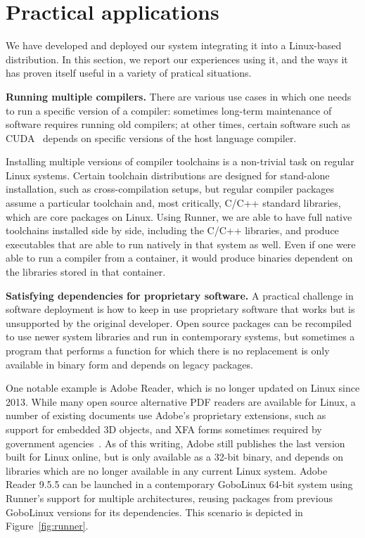 \documentclass[sigplan, anonymous, 10pt]{acmart}
\begin{document}
\section{Practical applications}\label{sec:applications}
We have developed and deployed our system integrating it into a Linux-based
distribution. In this section, we report our experiences using it, and the ways it has
proven itself useful in a variety of pratical situations.

\textbf{Running multiple compilers.}
There are various use cases in which one needs to run a specific version of
a compiler: sometimes long-term maintenance of software requires running
old compilers; at other times, certain software such as CUDA~\cite{nickolls2008:cuda}
depends on specific versions of the host language compiler.

Installing multiple versions of compiler toolchains is a non-trivial task on regular
Linux systems. Certain toolchain distributions are designed for stand-alone
installation, such as cross-compilation setups, but regular compiler packages
assume a particular toolchain and, most critically, C/C++ standard libraries, which
are core packages on Linux. Using Runner, we are able to have full native
toolchains installed side by side, including the C/C++ libraries, and produce
executables that are able to run natively in that system as well. Even if one
were able to run a compiler from a container, it would produce binaries dependent
on the libraries stored in that container.

\textbf{Satisfying dependencies for proprietary software.}
A practical challenge in software deployment is how to keep in use
proprietary software that works but is unsupported by the original developer.
Open source packages can be recompiled to use newer system libraries and
run in contemporary systems, but sometimes a program that performs
a function for which there is no replacement is only available in binary form
and depends on legacy packages.

One notable example is Adobe Reader, which is no longer updated on Linux since
2013. While many open source alternative PDF readers are available for Linux,
a number of existing documents use Adobe's proprietary extensions, such as
support for embedded 3D objects, and XFA forms sometimes required by
government agencies~\cite{grantsgov:adobe}. As of this writing, Adobe still publishes the last
version built for Linux online, but is only available as a 32-bit binary,
and depends on libraries which are no longer available in any current Linux
system. Adobe Reader 9.5.5 can be launched in a contemporary GoboLinux
64-bit system using Runner's support for multiple architectures,
reusing packages from previous GoboLinux versions for its dependencies.
This scenario is depicted in Figure~\ref{fig:runner}.
\end{document}
